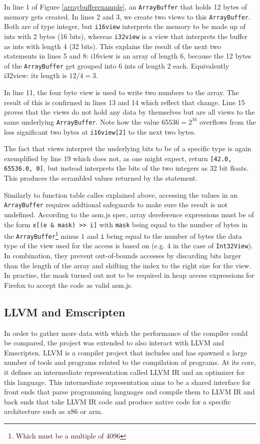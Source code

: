 \documentclass[11pt]{report}
\begin{document}
In line 1 of Figure \ref{arraybufferexample}, an \texttt{ArrayBuffer} that holds 12 bytes of memory gets created. In lines 2 and 3, we create two views to this \texttt{ArrayBuffer}. Both are of type integer, but \texttt{i16view} interprets the memory to be made up of ints with 2 bytes (16 bits), whereas \texttt{i32view} is a view that interprets the buffer as ints with length 4 (32 bits). This explains the result of the next two statements in lines 5 and 8: i16view is an array of length 6, because the 12 bytes of the \texttt{ArrayBuffer} get grouped into 6 ints of length 2 each. Equivalently i32view: its length is $12/4 = 3$.

In line 11, the four byte view is used to write two numbers to the array. The result of this is confirmed in lines 13 and 14 which reflect that change. Line 15 proves that the views do not hold any data by themselves but are all views to the same underlying \texttt{ArrayBuffer}. Note how the value $65536 = 2^{16}$ overflows from the less significant two bytes at \texttt{i16view[2]} to the next two bytes.

The fact that views interpret the underlying bits to be of a specific type is again exemplified by line 19 which does not, as one might expect, return \texttt{[42.0, 65536.0, 0]}, but instead interprets the bits of the two integers as 32 bit floats. This produces the scrambled values returned by the statement.

Similarly to function table calles explained above, accessing the values in an \texttt{ArrayBuffer} requires addtional safeguards to make sure the result is not undefined. According to the asm.js spec, array dereference expressions must be of the form \texttt{x[(e \& mask) {>}> i]} with \texttt{mask} being equal to the number of bytes in the \texttt{ArrayBuffer}\footnote{Which must be a multiple of $4096$} minus $1$ and \texttt{i} being equal to the number of bytes the data type of the view used for the access is based on (e.g. $4$ in the case of \texttt{Int32View}). In combination, they prevent out-of-bounds accesses by discarding bits larger than the length of the array and shifting the index to the right size for the view. In practise, the mask turned out not to be required in heap access expressions for Firefox to accept the code as valid asm.js.

\subsection{LLVM and Emscripten}
In order to gather more data with which the performance of the compiler could be compared, the project was extended to also interact with LLVM and Emscripten. LLVM is a compiler project that includes and has spawned a large number of tools and programs related to the compilation of programs. At its core, it defines an intermediate representation called LLVM IR and an optimizer for this language. This intermediate representation aims to be a shared interface for front ends that parse programming languages and compile them to LLVM IR and back ends that take LLVM IR code and produce native code for a specific architecture such as x86 or arm. 
\end{document}
